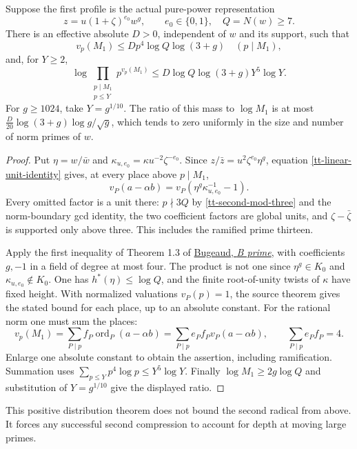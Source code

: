 \begin{theorem}\label{tt-second-small-primes}
Suppose the first profile is the actual pure-power representation
\[
 z=u(1+\zeta)^{e_0}w^g,\qquad e_0\in\{0,1\},\quad Q=N(w)\ge7.
\]
There is an effective absolute $D>0$, independent of $w$ and its support,
such that
\[
 v_p(M_1)\le Dp^4\log Q\log(3+g)\quad(p\mid M_1),
\]
and, for $Y\ge2$,
\[
 \log\prod_{\substack{p\mid M_1\\p\le Y}}p^{v_p(M_1)}
 \le D\log Q\log(3+g)Y^5\log Y.
\]
For $g\ge1024$, take $Y=g^{1/10}$. The ratio of this mass to $\log M_1$
is at most
$\frac D{20}\log(3+g)\log g/\sqrt g$, which tends to zero uniformly
in the size and number of norm primes of $w$.
\end{theorem}
\begin{proof}
Put $\eta=w/\bar w$ and
$\kappa_{u,e_0}=\kappa u^{-2}\zeta^{-e_0}$. Since
$z/\bar z=u^2\zeta^{e_0}\eta^g$, equation
\eqref{tt-linear-unit-identity} gives, at every place above $p\mid M_1$,
\[
 v_P(a-\alpha b)=v_P(\eta^g\kappa_{u,e_0}^{-1}-1).
\]
Every omitted factor is a unit there: $p\nmid3Q$ by
\eqref{tt-second-mod-three} and the norm-boundary gcd identity, the two
coefficient factors are global units, and $\zeta-\bar\zeta$ is supported
only above three. This includes the ramified prime thirteen.

Apply the first inequality of Theorem 1.3 of
\href{https://arxiv.org/html/2209.00275v1}{Bugeaud, \emph{B prime}},
with coefficients $g,-1$ in a field of degree at most four. The product is
not one since $\eta^g\in K_0$ and $\kappa_{u,e_0}\notin K_0$.
One has $h^*(\eta)\le\log Q$, and the finite root-of-unity twists of
$\kappa$ have fixed height. With normalized valuations $v_P(p)=1$, the
source theorem gives the stated bound for each place, up to an absolute
constant. For the rational norm one must sum the places:
\[
 v_p(M_1)=\sum_{P\mid p}f_P\operatorname{ord}_P(a-\alpha b)
 =\sum_{P\mid p}e_Pf_Pv_P(a-\alpha b),\qquad
 \sum_{P\mid p}e_Pf_P=4.
\]
Enlarge one absolute constant to obtain the assertion, including ramification.
Summation uses $\sum_{p\le Y}p^4\log p\le Y^5\log Y$.
Finally $\log M_1\ge2g\log Q$ and substitution of $Y=g^{1/10}$ give
the displayed ratio.
\end{proof}

This positive distribution theorem does not bound the second radical from
above. It forces any successful second compression to account for depth at
moving large primes.

